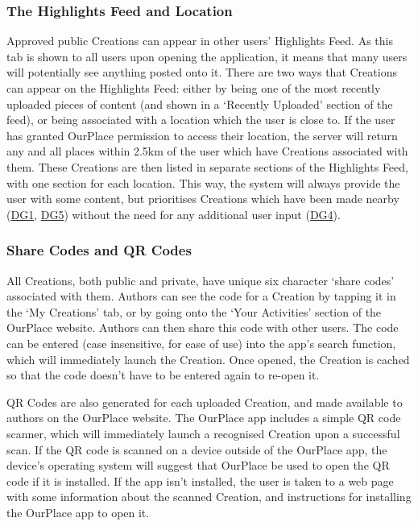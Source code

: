 \subsubsection{The Highlights Feed and Location}
Approved public Creations can appear in other users' Highlights Feed. As this tab is shown to all users upon opening the application, it means that many users will potentially see anything posted onto it. There are two ways that Creations can appear on the Highlights Feed: either by being one of the most recently uploaded pieces of content (and shown in a `Recently Uploaded' section of the feed), or being associated with a location which the user is close to. If the user has granted OurPlace permission to access their location, the server will return any and all places within 2.5km of the user which have Creations associated with them. These Creations are then listed in separate sections of the Highlights Feed, with one section for each location. This way, the system will always provide the user with some content, but prioritises Creations which have been made nearby (\hyperref[DG1]{DG1}, \hyperref[DG5]{DG5}) without the need for any additional user input (\hyperref[DG4]{DG4}).

\subsubsection{Share Codes and QR Codes}
All Creations, both public and private, have unique six character `share codes' associated with them. Authors can see the code for a Creation by tapping it in the `My Creations' tab, or by going onto the `Your Activities' section of the OurPlace website. Authors can then share this code with other users. The code can be entered (case insensitive, for ease of use) into the app's search function, which will immediately launch the Creation. Once opened, the Creation is cached so that the code doesn't have to be entered again to re-open it. 

QR Codes are also generated for each uploaded Creation, and made available to authors on the OurPlace website. The OurPlace app includes a simple QR code scanner, which will immediately launch a recognised Creation upon a successful scan. If the QR code is scanned on a device outside of the OurPlace app, the device's operating system will suggest that OurPlace be used to open the QR code if it is installed. If the app isn't installed, the user is taken to a web page with some information about the scanned Creation, and instructions for installing the OurPlace app to open it.

